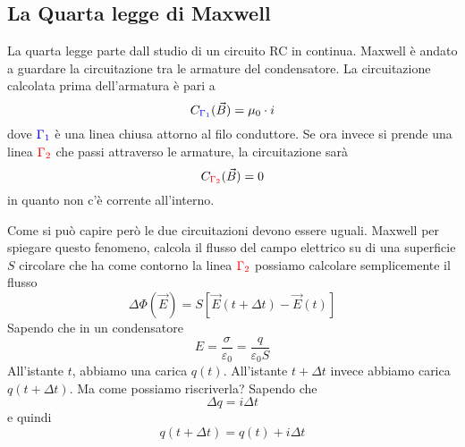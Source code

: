 \subsection{La Quarta legge di Maxwell}
La quarta legge parte dall studio di un circuito RC in continua. Maxwell è andato a guardare la 
circuitazione tra le armature del condensatore.
La circuitazione calcolata prima dell'armatura è pari a
\begin{equation*}
  C_{\mathcolor{blue}{\Gamma_1}}(\vec{B}) = \mu_0\cdot i
\end{equation*}
dove $\mathcolor{blue}{\Gamma_1}$ è una linea chiusa attorno al filo conduttore. Se ora invece si 
prende una linea  $\mathcolor{red}{\Gamma_2}$ che passi attraverso le armature, la circuitazione sarà
\begin{equation*}
  C_{\mathcolor{red}{\Gamma_2}}(\vec{B}) = 0
\end{equation*}
in quanto non c'è corrente all'interno.
\begin{center}
\end{center}
Come si può capire però le due circuitazioni devono essere uguali. Maxwell per spiegare questo 
fenomeno, calcola il flusso del
campo elettrico su di una superficie $S$ circolare che ha come contorno la linea 
$\mathcolor{red}{\Gamma_2}$ possiamo calcolare semplicemente il flusso
\begin{equation*}
  \Delta\Phi(\vec{E}) = S \left[ \vec{E}(t+\Delta t)-\vec{E}(t) \right]
\end{equation*}
Sapendo che in un condensatore
\begin{equation*}
  E = \frac{\sigma}{\varepsilon_0} = \frac{q}{\varepsilon_0 S}
\end{equation*}
All'istante $t$, abbiamo una carica $q(t)$. All'istante $t+\Delta t$ invece abbiamo carica 
$q(t+\Delta t)$. Ma come possiamo riscriverla? Sapendo che
\begin{equation*}
  \Delta q = i\Delta t
\end{equation*}
e quindi 
\begin{equation*}
  q(t+\Delta t) = q(t) + i\Delta t
\end{equation*}
